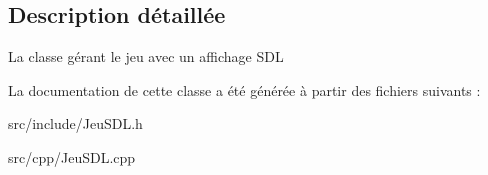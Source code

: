 \subsection{Description détaillée}
La classe gérant le jeu avec un affichage S\+D\+L 

La documentation de cette classe a été générée à partir des fichiers suivants \+:\begin{DoxyCompactItemize}
\item 
src/include/Jeu\+S\+D\+L.\+h\item 
src/cpp/Jeu\+S\+D\+L.\+cpp\end{DoxyCompactItemize}
